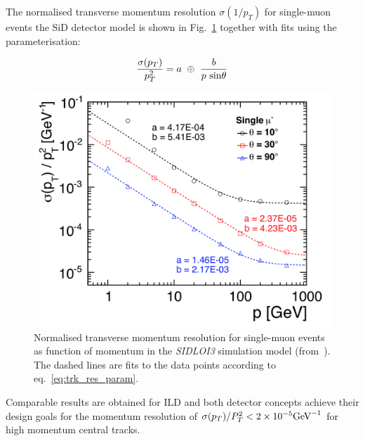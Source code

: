 The normalised transverse momentum resolution $\sigma(1/p_T)$ for single-muon events the SiD detector model is shown in
Fig.~\ref{fig:sid_mom_res} together with fits using the parameterisation:

\begin{equation}
  \frac{\sigma(p_T)}{p^2_T} = a~\oplus~\frac{b}{p~\rm{sin}\theta}     \label{eq:trk_res_param}
\end{equation}

\begin{figure}
\begin{center}
\includegraphics[width=0.95\hsize]{chapters/figures/SiD_momentum_resolution.png}
\end{center}
\caption{Normalised transverse momentum resolution for single-muon events as function of momentum
  in the \emph{SIDLOI3} simulation model (from~\cite{Behnke:2013lya}). The dashed lines are fits to the data points according
  to eq.~\ref{eq:trk_res_param}.}
\label{fig:sid_mom_res}
\end{figure}

Comparable results are obtained for ILD and both detector concepts achieve their design goals for the momentum resolution of
$\sigma(p_T)/P^2_T  < 2 \times 10^{-5} \rm{GeV}^{-1}$ for high momentum central tracks.

